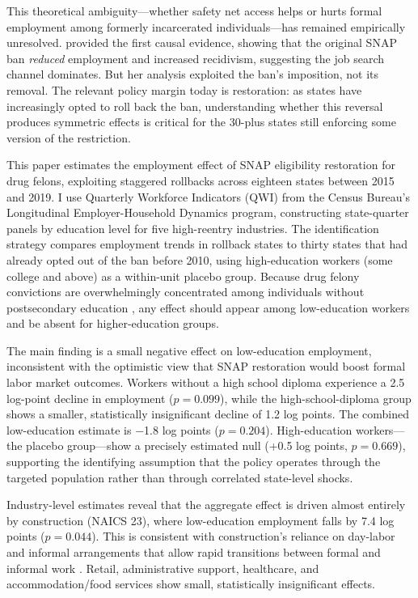 \documentclass[12pt]{article}
\begin{document}
This theoretical ambiguity---whether safety net access helps or hurts formal employment among formerly incarcerated individuals---has remained empirically unresolved. \citet{tuttle2019snap} provided the first causal evidence, showing that the original SNAP ban \textit{reduced} employment and increased recidivism, suggesting the job search channel dominates. But her analysis exploited the ban's imposition, not its removal. The relevant policy margin today is restoration: as states have increasingly opted to roll back the ban, understanding whether this reversal produces symmetric effects is critical for the 30-plus states still enforcing some version of the restriction.

This paper estimates the employment effect of SNAP eligibility restoration for drug felons, exploiting staggered rollbacks across eighteen states between 2015 and 2019. I use Quarterly Workforce Indicators (QWI) from the Census Bureau's Longitudinal Employer-Household Dynamics program, constructing state-quarter panels by education level for five high-reentry industries. The identification strategy compares employment trends in rollback states to thirty states that had already opted out of the ban before 2010, using high-education workers (some college and above) as a within-unit placebo group. Because drug felony convictions are overwhelmingly concentrated among individuals without postsecondary education \citep{harlow2003education}, any effect should appear among low-education workers and be absent for higher-education groups.

The main finding is a small negative effect on low-education employment, inconsistent with the optimistic view that SNAP restoration would boost formal labor market outcomes. Workers without a high school diploma experience a 2.5 log-point decline in employment ($p = 0.099$), while the high-school-diploma group shows a smaller, statistically insignificant decline of 1.2 log points. The combined low-education estimate is $-$1.8 log points ($p = 0.204$). High-education workers---the placebo group---show a precisely estimated null (+0.5 log points, $p = 0.669$), supporting the identifying assumption that the policy operates through the targeted population rather than through correlated state-level shocks.

Industry-level estimates reveal that the aggregate effect is driven almost entirely by construction (NAICS 23), where low-education employment falls by 7.4 log points ($p = 0.044$). This is consistent with construction's reliance on day-labor and informal arrangements that allow rapid transitions between formal and informal work \citep{apel2010criminal}. Retail, administrative support, healthcare, and accommodation/food services show small, statistically insignificant effects.
\end{document}
